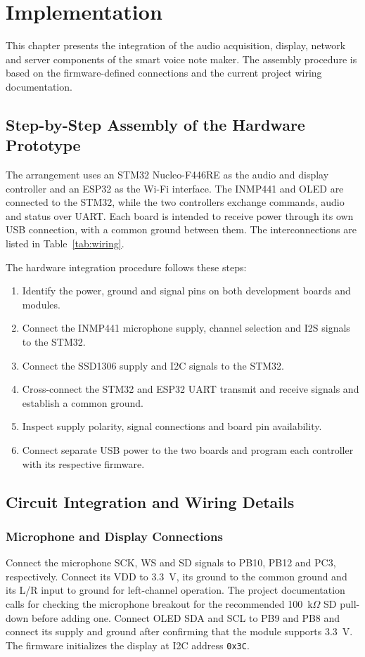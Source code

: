 \chapter{Implementation}
\label{ch:implementation}

This chapter presents the integration of the audio acquisition, display, network and server components of the smart voice note maker. The assembly procedure is based on the firmware-defined connections and the current project wiring documentation.

\section{Step-by-Step Assembly of the Hardware Prototype}
The arrangement uses an STM32 Nucleo-F446RE as the audio and display controller and an ESP32 as the Wi-Fi interface. The INMP441 and OLED are connected to the STM32, while the two controllers exchange commands, audio and status over UART. Each board is intended to receive power through its own USB connection, with a common ground between them. The interconnections are listed in Table~\ref{tab:wiring}.

The hardware integration procedure follows these steps:
\begin{enumerate}
\item Identify the power, ground and signal pins on both development boards and modules.
\item Connect the INMP441 microphone supply, channel selection and I2S signals to the STM32.
\item Connect the SSD1306 supply and I2C signals to the STM32.
\item Cross-connect the STM32 and ESP32 UART transmit and receive signals and establish a common ground.
\item Inspect supply polarity, signal connections and board pin availability.
\item Connect separate USB power to the two boards and program each controller with its respective firmware.
\end{enumerate}

\section{Circuit Integration and Wiring Details}
\subsection{Microphone and Display Connections}
Connect the microphone SCK, WS and SD signals to PB10, PB12 and PC3, respectively. Connect its VDD to 3.3~V, its ground to the common ground and its L/R input to ground for left-channel operation. The project documentation calls for checking the microphone breakout for the recommended 100~k$\Omega$ SD pull-down before adding one. Connect OLED SDA and SCL to PB9 and PB8 and connect its supply and ground after confirming that the module supports 3.3~V. The firmware initializes the display at I2C address \texttt{0x3C}.

